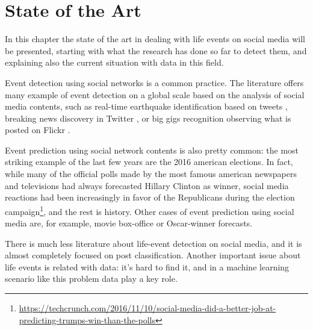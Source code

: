 \chapter{State of the Art}
\label{cha:soa}

In this chapter the state of the art in dealing with life events on social media will be presented, starting with what the research has done so far to detect them, and explaining also the current situation with data in this field.

Event detection using social networks is a common practice. The literature offers many example of event detection on a global scale based on the analysis of social media contents, such as real-time earthquake identification based on tweets \cite{sakaki2010earthquake}, breaking news discovery in Twitter \cite{jackoway2011identification, phuvipadawat2010breaking}, or big gigs recognition observing what is posted on Flickr \cite{liu2011using}.

Event prediction using social network contents is also pretty common: the most striking example of the last few years are the 2016 american elections. In fact, while many of the official polls made by the most famous american newspapers and televisions had always forecasted Hillary Clinton as winner, social media reactions had been increasingly in favor of the Republicans during the election campaign\footnote{\url{https://techcrunch.com/2016/11/10/social-media-did-a-better-job-at-predicting-trumps-win-than-the-polls}}, and the rest is history. Other cases of event prediction using social media are, for example, movie box-office \cite{asur2010predicting} or Oscar-winner forecasts.

There is much less literature about life-event detection on social media, and it is almost completely focused on post classification. Another important issue about life events is related with data: it's hard to find it, and in a machine learning scenario like this problem data play a key role.

